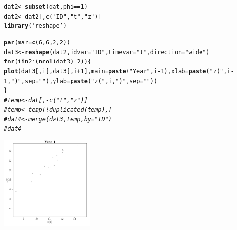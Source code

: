 \documentclass{article}\usepackage[]{graphicx}\usepackage[]{color}
\makeatletter
\newcommand{\hlnum}[1]{\textcolor[rgb]{0.686,0.059,0.569}{#1}}%
\newcommand{\hlstr}[1]{\textcolor[rgb]{0.192,0.494,0.8}{#1}}%
\newcommand{\hlcom}[1]{\textcolor[rgb]{0.678,0.584,0.686}{\textit{#1}}}%
\newcommand{\hlopt}[1]{\textcolor[rgb]{0,0,0}{#1}}%
\newcommand{\hlstd}[1]{\textcolor[rgb]{0.345,0.345,0.345}{#1}}%
\newcommand{\hlkwa}[1]{\textcolor[rgb]{0.161,0.373,0.58}{\textbf{#1}}}%
\newcommand{\hlkwb}[1]{\textcolor[rgb]{0.69,0.353,0.396}{#1}}%
\newcommand{\hlkwc}[1]{\textcolor[rgb]{0.333,0.667,0.333}{#1}}%
\newcommand{\hlkwd}[1]{\textcolor[rgb]{0.737,0.353,0.396}{\textbf{#1}}}%
\newenvironment{kframe}{%
 \def\at@end@of@kframe{}%
 \ifinner\ifhmode%
  \def\at@end@of@kframe{\end{minipage}}%
  \begin{minipage}{\columnwidth}%
 \fi\fi%
 \def\FrameCommand##1{\hskip\@totalleftmargin \hskip-\fboxsep
 \colorbox{shadecolor}{##1}\hskip-\fboxsep
     \hskip-\linewidth \hskip-\@totalleftmargin \hskip\columnwidth}%
 \MakeFramed {\advance\hsize-\width
   \@totalleftmargin\z@ \linewidth\hsize
   \@setminipage}}%
 {\par\unskip\endMakeFramed%
 \at@end@of@kframe}
\newenvironment{knitrout}{}{} %
\makeatother
\begin{document}
\begin{knitrout}
\color{fgcolor}\begin{kframe}
\begin{alltt}
\hlstd{dat2}\hlkwb{<-}\hlkwd{subset}\hlstd{(dat,phi}\hlopt{==}\hlnum{1}\hlstd{)}
\hlstd{dat2}\hlkwb{<-}\hlstd{dat2[,}\hlkwd{c}\hlstd{(}\hlstr{"ID"}\hlstd{,}\hlstr{"t"}\hlstd{,}\hlstr{"z"}\hlstd{)]}
\hlkwd{library}\hlstd{(}\hlstr{'reshape'}\hlstd{)}
\end{alltt}


{\ttfamily\noindent\itshape\color{messagecolor}{\#\# Loading required package: plyr\\\#\# \\\#\# Attaching package: 'reshape'\\\#\# \\\#\# The following objects are masked from 'package:plyr':\\\#\# \\\#\#\ \ \ \  rename, round\_any}}\begin{alltt}
\hlkwd{par}\hlstd{(}\hlkwc{mar}\hlstd{=}\hlkwd{c}\hlstd{(}\hlnum{6}\hlstd{,}\hlnum{6}\hlstd{,}\hlnum{2}\hlstd{,}\hlnum{2}\hlstd{))}
\hlstd{dat3}\hlkwb{<-}\hlkwd{reshape}\hlstd{(dat2,} \hlkwc{idvar} \hlstd{=} \hlstr{"ID"}\hlstd{,} \hlkwc{timevar} \hlstd{=} \hlstr{"t"}\hlstd{,} \hlkwc{direction} \hlstd{=} \hlstr{"wide"}\hlstd{)}
\hlkwa{for}\hlstd{(i} \hlkwa{in} \hlnum{2}\hlopt{:}\hlstd{(}\hlkwd{ncol}\hlstd{(dat3)}\hlopt{-}\hlnum{2}\hlstd{))\{}
  \hlkwd{plot}\hlstd{(dat3[,i],dat3[,i}\hlopt{+}\hlnum{1}\hlstd{],}\hlkwc{main}\hlstd{=}\hlkwd{paste}\hlstd{(}\hlstr{"Year"}\hlstd{,i}\hlopt{-}\hlnum{1}\hlstd{),}\hlkwc{xlab}\hlstd{=}\hlkwd{paste}\hlstd{(}\hlstr{"z("}\hlstd{,i}\hlopt{-}\hlnum{1}\hlstd{,}\hlstr{")"}\hlstd{,}\hlkwc{sep}\hlstd{=}\hlstr{""}\hlstd{),}\hlkwc{ylab}\hlstd{=}\hlkwd{paste}\hlstd{(}\hlstr{"z("}\hlstd{,i,}\hlstr{")"}\hlstd{,}\hlkwc{sep}\hlstd{=}\hlstr{""}\hlstd{))}
\hlstd{\}}
\hlcom{#temp<-dat[,-c("t","z")]}
\hlcom{#temp<-temp[!duplicated(temp),]}
\hlcom{#dat4<-merge(dat3,temp,by="ID")}
\hlcom{#dat4}
\end{alltt}
\end{kframe}
\includegraphics[width=0.35\textwidth]{figure/Reshaping1} 

\end{knitrout}
\end{document}
